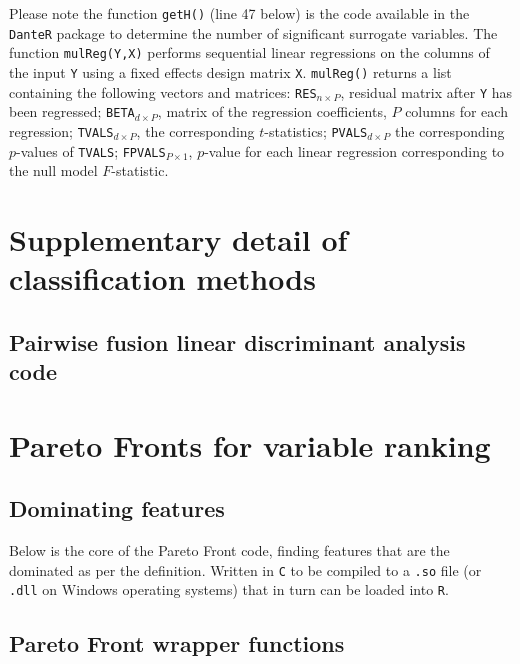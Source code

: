 \documentclass[12pt,a4paper,oneside]{report}
\begin{document}
\begin{appendix}
Please note the function \texttt{getH()} (line 47 below) is the code available in the \texttt{DanteR} package to determine the number of significant surrogate variables. The function \texttt{mulReg(Y,X)} performs sequential linear regressions on the columns of the input \texttt{Y} using a fixed effects design matrix \texttt{X}. \texttt{mulReg()} returns a list containing the following vectors and matrices: \texttt{RES}$_{n \times P}$, residual matrix after \texttt{Y} has been regressed; \texttt{BETA}$_{d \times P}$, matrix of the regression coefficients, $P$ columns for each regression; \texttt{TVALS}$_{d \times P}$, the corresponding $t$-statistics; \texttt{PVALS}$_{d \times P}$ the corresponding $p$-values of \texttt{TVALS}; \texttt{FPVALS}$_{P\times 1}$, $p$-value for each linear regression corresponding to the null model $F$-statistic.

	
	
\clearpage


\chapter{Supplementary detail of classification methods} \label{PFLDA}


\section[PFDA code]{Pairwise fusion linear discriminant analysis code} \label{PFLDAcode}

	

\clearpage

	

\clearpage



\chapter{Pareto Fronts for variable ranking} \label{PFs}

\section{Dominating features} \label{domfeatcode}

Below is the core of the Pareto Front code, finding features that are the dominated as per the definition. Written in {\tt C} to be compiled to a {\tt .so} file (or \texttt{.dll} on Windows operating systems) that in turn can be loaded into {\tt R}.

	



\section{Pareto Front wrapper functions} \label{cvPFs}

	


\end{appendix}

\clearpage





\end{document}
